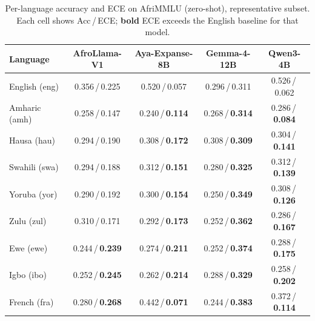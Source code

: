 \documentclass[11pt]{article}
\begin{document}
\begin{table}[h]\centering\small
\caption{Per-language accuracy and ECE on AfriMMLU (zero-shot), representative subset. Each cell
shows Acc\,/\,ECE; \textbf{bold} ECE exceeds the English baseline for that model.}
\label{tab:afrimmlu_lang}
\begin{tabular}{lcccc}
\toprule
\textbf{Language} & \textbf{AfroLlama-V1} & \textbf{Aya-Expanse-8B} & \textbf{Gemma-4-12B} & \textbf{Qwen3-4B}\\
\midrule
English (eng) & 0.356\,/\,0.225 & 0.520\,/\,0.057 & 0.296\,/\,0.311 & 0.526\,/\,0.062\\
\midrule
Amharic (amh) & 0.258\,/\,0.147 & 0.240\,/\,\textbf{0.114} & 0.268\,/\,\textbf{0.314} & 0.286\,/\,\textbf{0.084}\\
Hausa (hau)   & 0.294\,/\,0.190 & 0.308\,/\,\textbf{0.172} & 0.308\,/\,\textbf{0.309} & 0.304\,/\,\textbf{0.141}\\
Swahili (swa) & 0.294\,/\,0.188 & 0.312\,/\,\textbf{0.151} & 0.280\,/\,\textbf{0.325} & 0.312\,/\,\textbf{0.139}\\
Yoruba (yor)  & 0.290\,/\,0.192 & 0.300\,/\,\textbf{0.154} & 0.250\,/\,\textbf{0.349} & 0.308\,/\,\textbf{0.126}\\
Zulu (zul)    & 0.310\,/\,0.171 & 0.292\,/\,\textbf{0.173} & 0.252\,/\,\textbf{0.362} & 0.286\,/\,\textbf{0.167}\\
Ewe (ewe)     & 0.244\,/\,\textbf{0.239} & 0.274\,/\,\textbf{0.211} & 0.252\,/\,\textbf{0.374} & 0.288\,/\,\textbf{0.175}\\
Igbo (ibo)    & 0.252\,/\,\textbf{0.245} & 0.262\,/\,\textbf{0.214} & 0.288\,/\,\textbf{0.329} & 0.258\,/\,\textbf{0.202}\\
French (fra)  & 0.280\,/\,\textbf{0.268} & 0.442\,/\,\textbf{0.071} & 0.244\,/\,\textbf{0.383} & 0.372\,/\,\textbf{0.114}\\
\bottomrule
\end{tabular}
\end{table}
\end{document}
